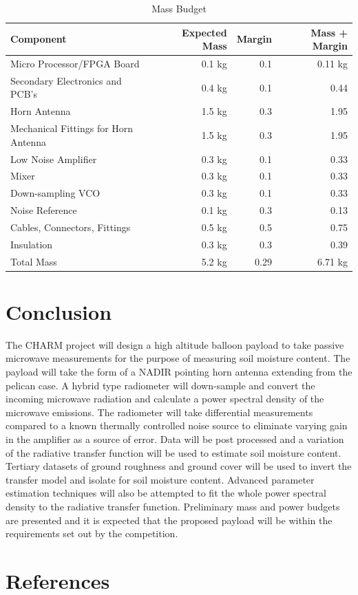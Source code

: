 \documentclass[12pt]{article}
\begin{document}
\begin{table}[H]
	\centering
	\vspace{0.5cm}
	\renewcommand{\arraystretch}{1.3}
	\caption{Mass Budget }
	\label{tab:massBudget}
	\begin{tabularx}{\textwidth}{lrrr}
		\toprule
		Component & Expected Mass & Margin & Mass + Margin \\		
		\midrule
		Micro Processor/FPGA Board			&0.1 kg & 0.1& 0.11 kg \\ 
		Secondary Electronics and PCB's		&0.4 kg & 0.1& 0.44 \\
		Horn Antenna						&1.5 kg & 0.3& 1.95 \\ 
		Mechanical Fittings for Horn Antenna&1.5 kg & 0.3& 1.95 \\ 				
		Low Noise Amplifier					&0.3 kg & 0.1& 0.33 \\ 
		Mixer						 		&0.3 kg & 0.1& 0.33 \\ 
		Down-sampling VCO			 		&0.3 kg & 0.1& 0.33 \\ 
		Noise Reference						&0.1 kg & 0.3& 0.13 \\
		Cables, Connectors, Fittings		&0.5 kg & 0.5& 0.75 \\
		Insulation							&0.3 kg & 0.3& 0.39 \\ 		\midrule
		Total Mass							&5.2 kg & 0.29& 6.71 kg
	\end{tabularx}	
\end{table}

\section{Conclusion}

The CHARM project will design a high altitude balloon payload to take passive microwave measurements for the purpose of measuring soil moisture content. The payload will take the form of a NADIR pointing horn antenna extending from the pelican case. A hybrid type radiometer will down-sample and convert the incoming microwave radiation and calculate a power spectral density of the microwave emissions. The radiometer will take differential measurements compared to a known thermally controlled noise source to eliminate varying gain in the amplifier as a source of error. Data will be post processed and a variation of the radiative transfer function will be used to estimate soil moisture content. Tertiary datasets of ground roughness and ground cover will be used to invert the transfer model and isolate for soil moisture content. Advanced parameter estimation techniques will also be attempted to fit the whole power spectral density to the radiative transfer function. Preliminary mass and power budgets are presented and it is expected that the proposed payload will be within the requirements set out by the competition.

\newpage
\section{References}


\end{document}
